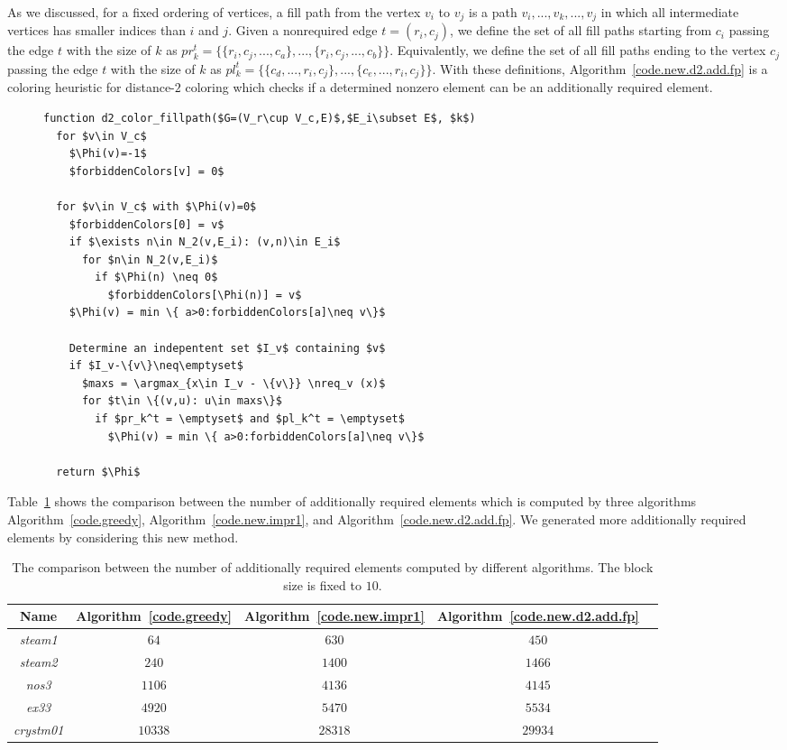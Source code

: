 \documentclass[12pt, twoside,a4paper,toc=bibliography]{scrbook}
\DeclareMathOperator*{\argmax}{arg\,max}
\newcommand{\coderef}[1]{Algorithm~\protect\ref{#1}}
\newcommand{\nreq}{L}
\begin{document}
As we discussed, for a fixed ordering of vertices,
a fill path from the vertex $v_i$ to $v_j$ is a path $v_i,...,v_k,...,v_j$
in which all intermediate vertices has smaller indices than $i$ and $j$.
Given a nonrequired edge $t=(r_i,c_j)$, we define the set of all fill paths starting
from $c_i$ passing the edge $t$ with the size of $k$ as
$pr_k^t = \{\{ r_i,c_j,...,c_a\},...,\{ r_i,c_j,...,c_b\}\}$.
Equivalently, we define the set of all fill paths ending to the vertex $c_j$
passing the edge $t$ with the size of $k$ as
$pl_k^t = \{ \{c_d,...,r_i,c_j\},..., \{c_e,...,r_i,c_j\}\}$.
With these definitions, \coderef{code.new.d2.add.fp} is a coloring heuristic
for distance-$2$ coloring which checks if a determined nonzero element can be an
additionally required element. 
\begin{figure}
\begin{lstlisting}[caption=New coloring heuristic for distance-$2$ coloring
predicting if a determined nonrequired elements can be an additionally required element.,
label=code.new.d2.add.fp,mathescape]
function d2_color_fillpath($G=(V_r\cup V_c,E)$,$E_i\subset E$, $k$)
  for $v\in V_c$
    $\Phi(v)=-1$
    $forbiddenColors[v] = 0$

  for $v\in V_c$ with $\Phi(v)=0$
    $forbiddenColors[0] = v$
    if $\exists n\in N_2(v,E_i): (v,n)\in E_i$
      for $n\in N_2(v,E_i)$
        if $\Phi(n) \neq 0$
          $forbiddenColors[\Phi(n)] = v$
    $\Phi(v) = min \{ a>0:forbiddenColors[a]\neq v\}$

    Determine an indepentent set $I_v$ containing $v$
    if $I_v-\{v\}\neq\emptyset$
      $maxs = \argmax_{x\in I_v - \{v\}} \nreq_v (x)$
      for $t\in \{(v,u): u\in maxs\}$
        if $pr_k^t = \emptyset$ and $pl_k^t = \emptyset$
          $\Phi(v) = min \{ a>0:forbiddenColors[a]\neq v\}$

  return $\Phi$
\end{lstlisting}
\end{figure}
Table~\ref{mats.add.gr.vs.nreq.vs.fillpath} shows the comparison between the number of additionally required elements
which is computed by three algorithms \coderef{code.greedy},
 \coderef{code.new.impr1}, and \coderef{code.new.d2.add.fp}. We generated more additionally required elements
by considering this new method.
\begin{table}
\centering
\begin{tabular}{|c|c|c|c|c|}
\hline
Name & \coderef{code.greedy}& \coderef{code.new.impr1} & \coderef{code.new.d2.add.fp}\\\hline
\textit{steam1} & $64$ & $630$ & $450$ \\\hline
\textit{steam2} & $240$ & $1400$ & $1466$ \\\hline
\textit{nos3} & $1106$ & $4136$ & $4145$\\\hline
\textit{ex33} & $4920$ & $5470$ & $5534$\\\hline
\textit{crystm01} & $10338$ & $28318$ & $29934$\\\hline
\end{tabular}
\caption{The comparison between the number of additionally required
elements computed by different algorithms. The block size is fixed to $10$.}
\label{mats.add.gr.vs.nreq.vs.fillpath}
\end{table}
\end{document}
